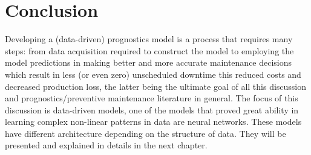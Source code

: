 \section{Conclusion}
Developing a (data-driven) prognostics model is a process that requires many steps: from data acquisition required to construct the model to employing the model predictions in making better and more accurate maintenance decisions which result in less (or even zero) unscheduled downtime this reduced costs and decreased production loss, the latter being the ultimate goal of all this discussion and prognostics/preventive maintenance literature in general. The focus of this discussion is data-driven models, one of the models that proved great ability in learning complex non-linear patterns in data are neural networks. These models have different architecture depending on the structure of data. They will be presented and explained in details in the next chapter.
